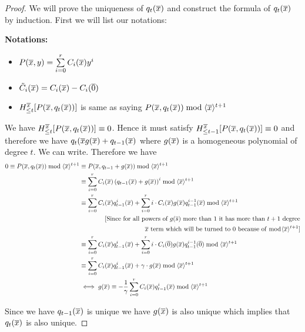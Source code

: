 \begin{proof}
	We will prove the uniqueness of $q_t(\overline{x})$ and construct the formula of $q_t(\overline{x})$ by induction. First we will list our notations:\parinf
	
	\textbf{Notations:}	
		\begin{itemize}
			\item $P(\overline{x},y)=\sum\limits_{i=0}^r C_i(\overline{x})y^i$
			\item $\tilde{C}_i(\overline{x})=C_{i}(\overline{x})-C_i(\overline{0})$
			\item $H_{\leq t}^{\overline{x}}[P(\overline{x},q_t(\overline{x}))]$ is same as saying $P(\overline{x},q_t(\overline{x}))\bmod \langle \overline{x}\rangle^{t+1}$
		\end{itemize}\parinn
	
	We have $H_{\leq t}^{\overline{x}}[P(\overline{x},q_t(\overline{x}))]\equiv 0$. Hence it must satisfy $H_{\leq t-1}^{\overline{x}}[P(\overline{x},q_t(\overline{x}))]\equiv 0$ and therefore we have $q_t(\overline{x} g(\overline{x})+q_{t-1}(\overline{x})$ where $g(\overline{x})$ is a homogeneous polynomial of degree $t$. We can write. Therefore we have
	\begin{align*}
		0\equiv P(\overline{x}, q_t(\overline{x}))\bmod \langle \overline{x}\rangle^{t+1}& \equiv P(\overline{x} , q_{t-1}+g(\overline{x}))\bmod \langle\overline{x}\rangle^{t+1}\\
		& \equiv \sum_{i=0}^r C_{i}(\overline{x})\left(q_{t-1}(\overline{x})+g(\overline{x})\right)^{i}\bmod \langle\overline{x}\rangle^{t+1}\\
		& \equiv \sum_{i=0}^r C_i(\overline{x})q_{t-1}^i(\overline{x})+\sum_{i=0}^ri\cdot C_i(\overline{x})g(\overline{x}) q_{t-1}^{i-1}(\overline{x})\bmod \langle\overline{x}\rangle^{t+1}\\
		&\qquad\qquad [\text{Since for all powers of $g(\overline{s})$ more than 1 it has more than $t+1$ degree}\\
		& \qquad\qquad\qquad\qquad\qquad\text{ $\overline{x}$ term which will be turned to 0 because of $\bmod \langle\overline{x}\rangle^{t+1}$}]\\ 
		&\equiv \sum_{i=0}^r C_i(\overline{x})q_{t-1}^i(\overline{x})+\sum_{i=0}^r i\cdot C_i(\overline{0})g(\overline{x})q_{t-1}^{i-1}(\overline{0})\bmod \langle\overline{x}\rangle^{t+1}\\
		& \equiv \sum_{i=0}^rC_i(\overline{x})q_{t-1}^i(\overline{x})+\gamma\cdot g(\overline{x})\bmod \langle\overline{x}\rangle^{t+1}\\
		&\iff g(\overline{x}) \equiv -\frac{1}{\gamma}\sum_{i=0}^rC_{i}(\overline{x})q_{t-1}^i(\overline{x})\bmod \langle\overline{x}\rangle^{t+1}
	\end{align*}
	
	Since we have $q_{t-1}(\overline{x})$ is unique we have $g(\overline{x})$ is also unique which implies that $q_t(\overline{x})$ is also unique.
\end{proof}



